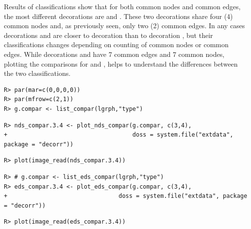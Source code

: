 \documentclass[article]{jss}\usepackage{knitr}
\begin{document}
Results of classifications show that for both common nodes and common edges, the most different decorations are  and . These two decorations share four (4) common nodes and, as previously seen, only two (2) common edges.
In any cases decorations  and  are closer to decoration  than to decoration , but their classifications changes depending on counting of common nodes or common edges. While decorations  and  have 7 common edges and 7 common nodes, plotting the comparisons for  and , helps to understand the differences between the two classifications.

\begin{kframe}
\begin{verbatim}
R> par(mar=c(0,0,0,0))
R> par(mfrow=c(2,1))
R> g.compar <- list_compar(lgrph,"type")
\end{verbatim}


{\ttfamily\noindent\bfseries\color{errorcolor}{\#\# Error in utils::combn(1:length(lgrph), 2): object 'lgrph' not found}}\begin{verbatim}
R> nds_compar.3.4 <- plot_nds_compar(g.compar, c(3,4),
+                                    doss = system.file("extdata", package = "decorr"))
\end{verbatim}


{\ttfamily\noindent\bfseries{}}\begin{verbatim}
R> plot(image_read(nds_compar.3.4))
\end{verbatim}


{\ttfamily\noindent\bfseries\color{errorcolor}{\#\# Error in image\_read(nds\_compar.3.4): object 'nds\_compar.3.4' not found}}\begin{verbatim}
R> # g.compar <- list_eds_compar(lgrph,"type")
R> eds_compar.3.4 <- plot_eds_compar(g.compar, c(3,4),
+                                doss = system.file("extdata", package = "decorr"))
\end{verbatim}


{\ttfamily\noindent\bfseries{}}\begin{verbatim}
R> plot(image_read(eds_compar.3.4))
\end{verbatim}


{\ttfamily\noindent\bfseries\color{errorcolor}{\#\# Error in image\_read(eds\_compar.3.4): object 'eds\_compar.3.4' not found}}\end{kframe}
\end{document}
